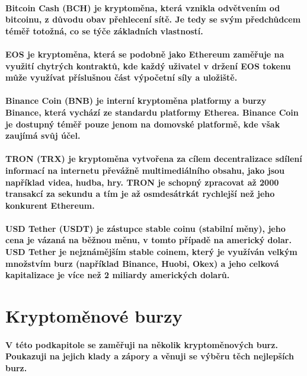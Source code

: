 \documentclass[thesis=B,czech]{FITthesis}[2019/03/21]
\begin{document}
\paragraph{
Bitcoin Cash (BCH) je kryptoměna, která vznikla odvětvením od bitcoinu, z důvodu obav přehlecení sítě. Je tedy se svým předchůdcem téměř totožná, co se týče základních vlastností. \cite{kurzy_bch}
}
\paragraph{
EOS je kryptoměna, která se podobně jako Ethereum zaměřuje na využití chytrých kontraktů, kde každý uživatel v držení EOS tokenu může využívat příslušnou část výpočetní síly a uložiště. \cite{finex_eos}
}
\paragraph{
Binance Coin (BNB) je interní kryptoměna platformy a burzy Binance, která vychází ze standardu platformy Etherea. Binance Coin je dostupný téměř pouze jenom na domovské platformě, kde však zaujímá svůj účel. \cite{martin_sistek_bnb}
}
\paragraph{
TRON (TRX) je kryptoměna vytvořena za cílem decentralizace sdílení informací na internetu převážně multimediálního obsahu, jako jsou například videa, hudba, hry. TRON je schopný zpracovat až 2000 transakcí za sekundu a tím je až osmdesátrkát rychlejší než jeho konkurent Ethereum. \cite{finex_trx}
}
\paragraph{
USD Tether (USDT) je zástupce stable coinu (stabilní měny), jeho cena je vázaná na běžnou měnu, v tomto případě na americký dolar. USD Tether je nejznámějším stable coinem, který je využíván velkým množstvím burz (například Binance, Huobi, Okex) a jeho celková kapitalizace je více než 2 miliardy amerických dolarů. \cite{mlady_investor_stable_coin} 
}
\section{Kryptoměnové burzy}
\paragraph{
V této podkapitole se zaměřuji na několik kryptoměnových burz. Poukazuji na jejich klady a zápory a věnuji se výběru těch nejlepších burz.
}
\end{document}
